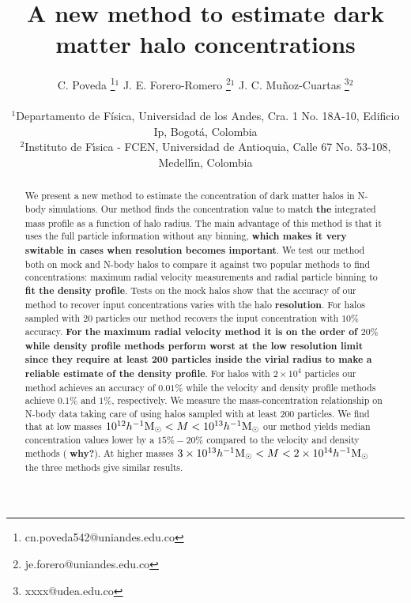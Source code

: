 \documentclass[a4,useAMS,usenatbib,usegraphicx]{mn2e}
\newcommand{\hMsun}{{\ifmmode{h^{-1}{\rm {M_{\odot}}}}\else{$h^{-1}{\rm{M_{\odot}}}$}\fi}}
\begin{document}
\title{A new method to estimate dark matter halo concentrations}
\author[C. Poveda, J.E. Forero-Romero, J.C. Mu\~noz-Cuartas]{
\parbox[t]{\textwidth}{\raggedright 
  C. Poveda \thanks{cn.poveda542@uniandes.edu.co}$^{1}$
  J. E. Forero-Romero \thanks{je.forero@uniandes.edu.co}$^{1}$
  J. C. Mu\~noz-Cuartas \thanks{xxxx@udea.edu.co}$^{2}$
}
\vspace*{6pt}\\
$^1$Departamento de F\'{i}sica, Universidad de los Andes, Cra. 1
No. 18A-10, Edificio Ip, Bogot\'a, Colombia\\
$^2$Instituto de F\'{\i}sica - FCEN, Universidad de Antioquia, Calle
67 No. 53-108, Medell\'{\i}n, Colombia
}

\maketitle

\begin{abstract}

We present a new method to estimate the concentration of dark matter
halos in N-body simulations.  Our method finds the concentration value
to match {\bf the} integrated mass profile as a function of halo
radius.  The main advantage of this method is that it uses the full
particle information without any binning, {\bf which makes it very
  switable in cases when resolution becomes important}. We test our
method both on mock and N-body halos to compare it against two popular
methods to find concentrations: maximum radial velocity measurements
and radial particle binning to {\bf fit the density profile}. Tests on
the mock halos show that the accuracy of our method to recover input
concentrations varies with the halo {\bf resolution}. For halos
sampled with $20$ particles our method recovers the input
concentration with $10\%$ accuracy. {\bf For the maximum radial
  velocity method it is on the order of $20\%$ while density profile
  methods perform worst at the low resolution limit since they require
  at least 200 particles inside the virial radius to make a reliable
  estimate of the density profile}. For halos with $2\times 10^4$
particles our method achieves an accuracy of $0.01\%$ while the
velocity and density profile methods achieve $0.1\%$ and $1\%$,
respectively. We measure the mass-concentration relationship on N-body
data taking care of using halos sampled with at least $200$
particles. We find that at low masses $10^{12}\hMsun <
M<10^{13}\hMsun$ our method yields median concentration values lower
by a $15\%-20\%$ compared to the velocity and density methods ({\bf
  why?}).  At higher masses $3\times 10^{13}\hMsun < M < 2\times
10^{14}\hMsun$ the three methods give similar results.
\end{abstract}
\end{document}
